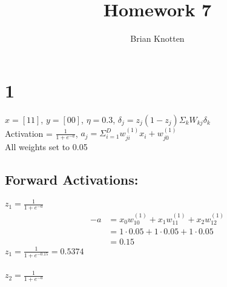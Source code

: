 \documentclass[letterpaper,notitlepage,twoside, fleqn]{article}
\begin{document}
\title{Homework 7}
\author{Brian Knotten}
\maketitle

\section*{1}
$x = [1 1]$, $y = [0 0]$, $\eta = 0.3$, $\delta_j = z_j (1 - z_j) \Sigma_k W_{kj} \delta_k$ \\
Activation = $\frac{1}{1+e^{-a}}$, $a_j = \Sigma_{i=1}^D w^{(1)}_{ji} x_i + w_{j0}^{(1)}$\\
All weights set to 0.05 \\
\subsection*{Forward Activations:}
$z_1 = \frac{1}{1+e^{-a}}$
\begin{align*}
-a & = x_0 w^{(1)}_{10} + x_1 w^{(1)}_{11} + x_2 w^{(1)}_{12} \\
 & = 1 \cdot 0.05 + 1 \cdot 0.05 + 1 \cdot 0.05 \\
 & = 0.15
 \end{align*}
$z_1 = \frac{1}{1+e^{-0.15}} = 0.5374$ \\\\
$z_2 = \frac{1}{1+e^{-a}}$
\end{document}

